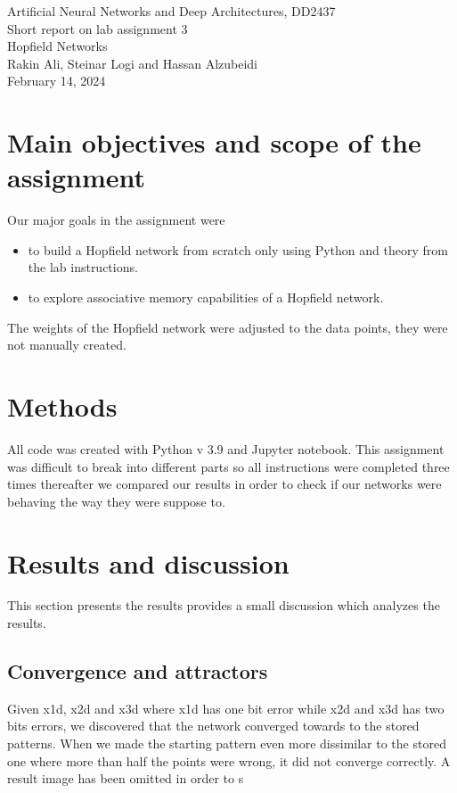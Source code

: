 \documentclass[a4paper]{article}
\begin{document}
\begin{center}
  {\large Artificial Neural Networks and Deep Architectures, DD2437}\\
  \vspace{7mm}
  {\huge Short report on lab assignment 3\\[1ex]}
  {\Large Hopfield Networks}\\
  \vspace{8mm}  
  {\Large Rakin Ali, Steinar Logi and Hassan Alzubeidi\\}
  \vspace{4mm}
  {\large February 14, 2024\\}
\end{center}

\section{Main objectives and scope of the assignment}
Our major goals in the assignment were  
\begin{itemize}
\item to build a Hopfield network from scratch only using Python and theory from the lab instructions.
\item to explore associative memory capabilities of a Hopfield network.
\end{itemize}

The weights of the Hopfield network were adjusted to the data points, they were not manually created.

\section{Methods}
All code was created with Python v 3.9 and Jupyter notebook. This assignment was difficult to break into different parts so all instructions were completed three times thereafter we compared our results in order to check if our networks were behaving the way they were suppose to. 

\section{Results and discussion}
This section presents the results provides a small discussion which analyzes the results.

\subsection{Convergence and attractors}
Given x1d, x2d and x3d where x1d has one bit error while x2d and x3d has two bits errors, we discovered that the network converged towards to the stored patterns. When we made the starting pattern even more dissimilar to the stored one where more than half the points were wrong, it did not converge correctly. A result image has been omitted in order to s
\end{document}
